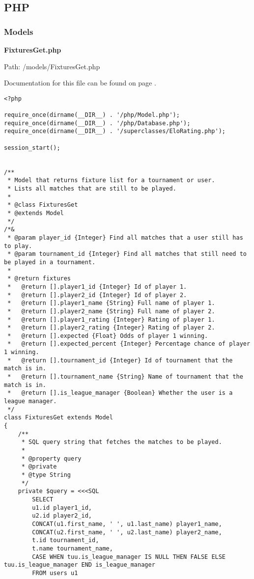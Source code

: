 \newpage
\subsection{PHP}
\subsubsection{Models}
\textbf{FixturesGet.php}\label{FixturesGet.php}

Path: /models/FixturesGet.php

Documentation for this file can be found on page \pageref{FixturesGet.php.doc}.

{\scriptsize
\begin{lstlisting}
<?php

require_once(dirname(__DIR__) . '/php/Model.php');
require_once(dirname(__DIR__) . '/php/Database.php');
require_once(dirname(__DIR__) . '/superclasses/EloRating.php');

session_start();


/**
 * Model that returns fixture list for a tournament or user.
 * Lists all matches that are still to be played.
 *
 * @class FixturesGet
 * @extends Model
 */
/*&
 * @param player_id {Integer} Find all matches that a user still has to play.
 * @param tournament_id {Integer} Find all matches that still need to be played in a tournament.
 *
 * @return fixtures
 *   @return [].player1_id {Integer} Id of player 1.
 *   @return [].player2_id {Integer} Id of player 2.
 *   @return [].player1_name {String} Full name of player 1.
 *   @return [].player2_name {String} Full name of player 2.
 *   @return [].player1_rating {Integer} Rating of player 1.
 *   @return [].player2_rating {Integer} Rating of player 2.
 *   @return [].expected {Float} Odds of player 1 winning.
 *   @return [].expected_percent {Integer} Percentage chance of player 1 winning.
 *   @return [].tournament_id {Integer} Id of tournament that the match is in.
 *   @return [].tournament_name {String} Name of tournament that the match is in.
 *   @return [].is_league_manager {Boolean} Whether the user is a league manager.
 */
class FixturesGet extends Model
{
	/**
	 * SQL query string that fetches the matches to be played.
	 *
	 * @property query
	 * @private
	 * @type String
	 */
	private $query = <<<SQL
		SELECT
		u1.id player1_id,
		u2.id player2_id,
		CONCAT(u1.first_name, ' ', u1.last_name) player1_name,
		CONCAT(u2.first_name, ' ', u2.last_name) player2_name,
		t.id tournament_id,
		t.name tournament_name,
		CASE WHEN tuu.is_league_manager IS NULL THEN FALSE ELSE tuu.is_league_manager END is_league_manager
		FROM users u1


\end{lstlisting}}

